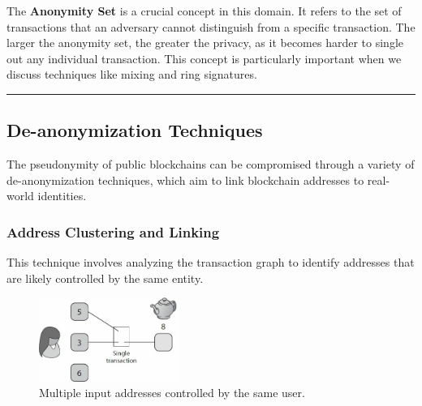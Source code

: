 The \textbf{Anonymity Set} is a crucial concept in this domain. It
refers to the set of transactions that an adversary cannot distinguish
from a specific transaction. The larger the anonymity set, the
greater the privacy, as it becomes harder to single out any individual
transaction. This concept is particularly important when we discuss
techniques like mixing and ring signatures.


\begin{center}\rule{0.5\linewidth}{0.5pt}\end{center}

\subsection{De-anonymization
Techniques}\label{section-2-de-anonymization-techniques}

The pseudonymity of public blockchains can be compromised through a
variety of de-anonymization techniques, which aim to link blockchain
addresses to real-world identities.


\subsubsection{Address Clustering and
Linking}\label{address-clustering-and-linking}

This technique involves analyzing the transaction graph to identify
addresses that are likely controlled by the same entity.



\begin{figure}[t]
	\begin{center}
		\includegraphics[width=0.4\textwidth]{./figs/deanon1.png}
		\caption{Multiple input addresses controlled by the same user.}		
		\label{fig:deanon1}
	\end{center}	
\end{figure}

